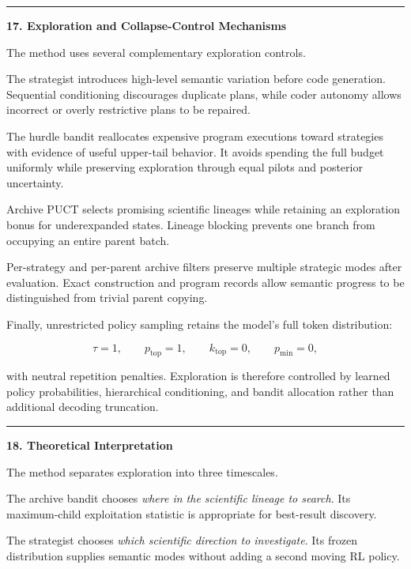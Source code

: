\documentclass[
]{article}
\begin{document}
\begin{center}\rule{0.5\linewidth}{0.5pt}\end{center}

\textbf{17. Exploration and Collapse-Control Mechanisms}

The method uses several complementary exploration controls.

The strategist introduces high-level semantic variation before code
generation. Sequential conditioning discourages duplicate plans, while
coder autonomy allows incorrect or overly restrictive plans to be
repaired.

The hurdle bandit reallocates expensive program executions toward
strategies with evidence of useful upper-tail behavior. It avoids
spending the full budget uniformly while preserving exploration through
equal pilots and posterior uncertainty.

Archive PUCT selects promising scientific lineages while retaining an
exploration bonus for underexpanded states. Lineage blocking prevents
one branch from occupying an entire parent batch.

Per-strategy and per-parent archive filters preserve multiple strategic
modes after evaluation. Exact construction and program records allow
semantic progress to be distinguished from trivial parent copying.

Finally, unrestricted policy sampling retains the model's full token
distribution:

\[
\tau=1,\qquad
p_{\mathrm{top}}=1,\qquad
k_{\mathrm{top}}=0,\qquad
p_{\min}=0,
\]

with neutral repetition penalties. Exploration is therefore controlled
by learned policy probabilities, hierarchical conditioning, and bandit
allocation rather than additional decoding truncation.

\begin{center}\rule{0.5\linewidth}{0.5pt}\end{center}

\textbf{18. Theoretical Interpretation}

The method separates exploration into three timescales.

The archive bandit chooses \emph{where in the scientific lineage to
search}. Its maximum-child exploitation statistic is appropriate for
best-result discovery.

The strategist chooses \emph{which scientific direction to investigate}.
Its frozen distribution supplies semantic modes without adding a second
moving RL policy.
\end{document}
